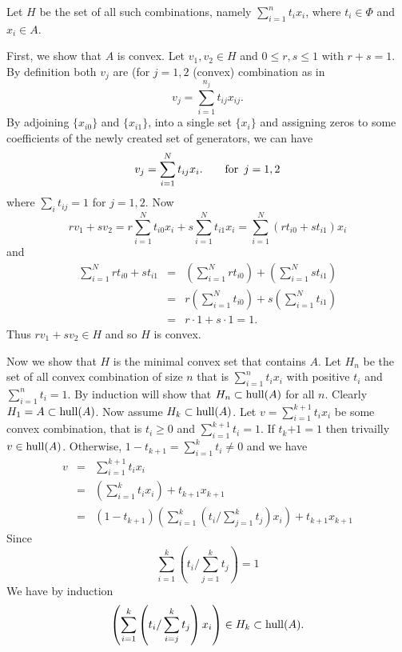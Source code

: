 \begin{enumerate}
Let $H$ be the set of all such combinations, namely \(\sum_{i=1}^n t_ix_i\),
where \(t_i\in \Phi\) and \(x_i\in A\).

First, we show that $A$ is convex.
Let \(v_1,v_2\in H\) and \(0\leq r,s \leq 1\) with \(r+s=1\).
By definition both \(v_j\) are (for \(j=1,2\) (convex) combination as in
\begin{equation*}
v_j = \sum_{i=1}^{n_j} t_{ij} x_{ij}.
\end{equation*}
By adjoining \(\{x_{i0}\}\) and \(\{x_{i1}\}\), into 
a single set \(\{x_i\}\)
and assigning zeros to
some coefficients of the newly created set of generators, we can have
\begin{equation*}
v_j = \sum_{i=1}^{N} t_{ij} x_i.  \qquad \textnormal{for }\, j=1,2
\end{equation*}
where \(\sum_i t_{ij} = 1\) for \(j=1,2\).
Now 
\begin{equation*}
rv_1 + sv_2 = 
r\sum_{i=1}^N t_{i0} x_i +
s\sum_{i=1}^N t_{i1} x_i =
\sum_{i=1}^N (rt_{i0} + st_{i1}) x_i
\end{equation*}
and
\begin{eqnarray*}
\sum_{i=1}^N r t_{i0} + s t_{i1} 
 &=&  \left(\sum_{i=1}^N r t_{i0}\right) +
      \left(\sum_{i=1}^N s t_{i1}\right) \\
 &=&  r\left(\sum_{i=1}^N t_{i0}\right) +
      s\left(\sum_{i=1}^N t_{i1}\right) \\
 &=&  r\cdot 1 + s \cdot 1 = 1.
\end{eqnarray*}
Thus \(rv_1 + sv_2 \in H\) and so $H$ is convex.

Now we show that $H$ is the minimal convex set that contains $A$.
Let \(H_n\) be the set of all convex combination of size $n$
that is \(\sum_{i=1}^n t_i x_i\) with positive \(t_i\) 
and \(\sum_{i=1}^n t_i = 1\).
By induction will show that \(H_n \subset \mathop{\rm hull}\nolimits(A)\) for all $n$.
Clearly \(H_1 = A \subset \mathop{\rm hull}\nolimits(A)\).
Now assume \(H_k \subset \mathop{\rm hull}\nolimits(A)\).
Let \(v = \sum_{i=1}^{k+1} t_i x_i\) 
be some convex combination, that is \(t_i\geq 0\) 
and \(\sum_{i=1}^{k+1} t_i = 1\).
If \(t_k{+1} = 1\) then trivailly \(v\in \mathop{\rm hull}\nolimits(A)\).
Otherwise,  \(1 - t_{k+1} = \sum_{i=1}^k t_i \neq 0 \) 
and we have
\begin{eqnarray} \label{eq:convex:k1}
v &=& \sum_{i=1}^{k+1} t_i x_i \\
 &=& \left(\sum_{i=1}^k t_i x_i \right) + t_{k+1}x_{k+1} \\
 &=& (1 -t_{k+1}) 
      \left(\sum_{i=1}^k \left(t_i/\sum_{j=1}^k t_j\right)x_i \right) 
      + t_{k+1}x_{k+1} 
\end{eqnarray}
Since 
\begin{equation*}
 \sum_{i=1}^k \left(t_i/\sum_{j=1}^k t_j\right) = 1
\end{equation*}
We have by induction
\begin{equation*}
 \left(\sum_{i=1}^k \left(t_i/\sum_{i=j}^k t_j\right)x_i \right)
  \in H_k \subset \mathop{\rm hull}\nolimits(A).
\end{equation*}


\end{enumerate}
